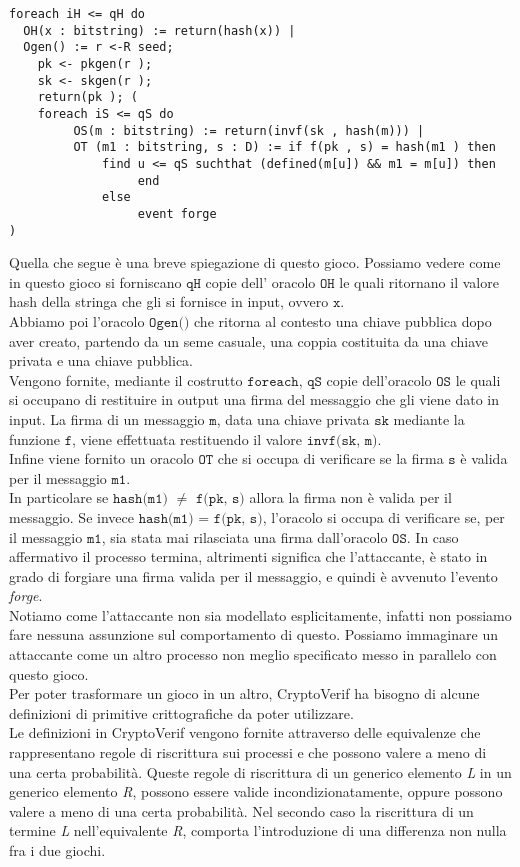 \documentclass[a4paper,openright,twoside,12pt]{report}
\begin{document}
\begin{verbatim}
foreach iH <= qH do   
  OH(x : bitstring) := return(hash(x)) |
  Ogen() := r <-R seed;     
    pk <- pkgen(r );    
    sk <- skgen(r );       
    return(pk ); (
    foreach iS <= qS do 
         OS(m : bitstring) := return(invf(sk , hash(m))) |
         OT (m1 : bitstring, s : D) := if f(pk , s) = hash(m1 ) then
             find u <= qS suchthat (defined(m[u]) && m1 = m[u]) then
                  end
             else
                  event forge
)         
\end{verbatim}

Quella che segue \`e una breve spiegazione di questo gioco.
Possiamo vedere come in questo gioco si forniscano $\texttt{qH}$ copie dell' oracolo $\texttt{OH}$ le quali ritornano il valore hash della stringa che gli si fornisce in input, ovvero $\texttt{x}$.\\
Abbiamo poi l'oracolo $\texttt{Ogen()}$ che ritorna al contesto una chiave pubblica dopo aver creato, partendo da un seme casuale, una coppia costituita da una chiave privata e una chiave pubblica.\\
Vengono fornite, mediante il costrutto $\texttt{foreach}$, $\texttt{qS}$ copie dell'oracolo $\texttt{OS}$ le quali si occupano di restituire in output una firma del messaggio che gli viene dato in input.
La firma di un messaggio $\texttt{m}$, data una chiave privata $\texttt{sk}$ mediante la funzione $\texttt{f}$, viene effettuata restituendo il valore $\texttt{invf(sk, m)}$.\\ 
Infine viene fornito un oracolo $\texttt{OT}$ che si occupa di verificare se la firma $\texttt{s}$ \`e valida per il messaggio $\texttt{m1}$. \\
In particolare se $\texttt{hash(m1)}$ $\neq$ $\texttt{f(pk, s)}$ allora la firma non \`e valida per il messaggio. Se invece $\texttt{hash(m1) = f(pk, s)}$,
l'oracolo si occupa di verificare se, per il messaggio $\texttt{m1}$, sia stata mai rilasciata una firma dall'oracolo $\texttt{OS}$. In caso affermativo il processo termina, altrimenti significa che 
l'attaccante, \`e stato in grado di forgiare una firma valida per il messaggio, e quindi \`e avvenuto l'evento \emph{forge}.\\
Notiamo come l'attaccante non sia modellato esplicitamente, infatti non possiamo fare nessuna assunzione sul comportamento di questo.
Possiamo immaginare un attaccante come un altro processo non meglio specificato messo in parallelo con questo gioco.\\ 
Per poter trasformare un gioco in un altro, CryptoVerif ha bisogno di alcune definizioni di primitive crittografiche da poter utilizzare.
\\
Le definizioni in CryptoVerif vengono fornite attraverso delle equivalenze che rappresentano regole di riscrittura sui processi e che possono valere a meno di una certa probabilit\`a.
Queste regole di riscrittura di un generico elemento \emph{L} in un generico elemento \emph{R}, possono essere valide incondizionatamente, 
oppure possono valere a meno di una certa probabilit\`a.
Nel secondo caso la riscrittura di un termine \emph{L} nell'equivalente \emph{R}, comporta l'introduzione di una differenza non nulla fra i due giochi.\\ 
\end{document}
